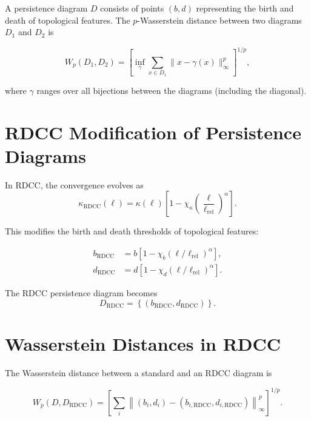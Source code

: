 \documentclass[11pt,a4paper]{article}
\begin{document}
A persistence diagram $D$ consists of points $(b,d)$ representing the birth and 
death of topological features. The $p$-Wasserstein distance between two diagrams 
$D_{1}$ and $D_{2}$ is

\begin{equation}
    W_{p}(D_{1},D_{2})
    = \left[
        \inf_{\gamma}
        \sum_{x \in D_{1}}
        \| x - \gamma(x) \|_{\infty}^{p}
      \right]^{1/p},
\end{equation}

where $\gamma$ ranges over all bijections between the diagrams (including the 
diagonal).
\section{RDCC Modification of Persistence Diagrams}

In RDCC, the convergence evolves as
\begin{equation}
    \kappa_{\mathrm{RDCC}}(\ell)
    = \kappa(\ell)
      \left[
        1 - \chi_{\kappa}
        \left(\frac{\ell}{\ell_{\mathrm{rel}}}\right)^{\alpha}
      \right].
\end{equation}

This modifies the birth and death thresholds of topological features:

\begin{align}
    b_{\mathrm{RDCC}} &= b \left[ 1 - \chi_{b} (\ell/\ell_{\mathrm{rel}})^{\alpha} \right], \\
    d_{\mathrm{RDCC}} &= d \left[ 1 - \chi_{d} (\ell/\ell_{\mathrm{rel}})^{\alpha} \right].
\end{align}

The RDCC persistence diagram becomes
\begin{equation}
    D_{\mathrm{RDCC}}
    = \left\{
        (b_{\mathrm{RDCC}}, d_{\mathrm{RDCC}})
      \right\}.
\end{equation}
\section{Wasserstein Distances in RDCC}

The Wasserstein distance between a standard and an RDCC diagram is

\begin{equation}
    W_{p}(D, D_{\mathrm{RDCC}})
    = \left[
        \sum_{i}
        \left\|
          (b_{i}, d_{i})
          -
          (b_{i,\mathrm{RDCC}}, d_{i,\mathrm{RDCC}})
        \right\|_{\infty}^{p}
      \right]^{1/p}.
\end{equation}
\end{document}
